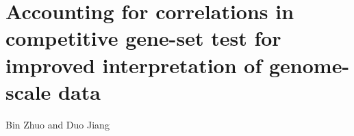 \section{Accounting for correlations in competitive gene-set
	test for improved interpretation of genome-scale data}\label{chap3}

\vspace*{5cm}
\begin{centering}
	{\normalsize Bin Zhuo and Duo Jiang}\\[.04\textheight]
\end{centering}	
\vspace*{5cm}

\newpage


	\begin{abstract}
	Competitive gene-set test is a widely used tool for interpreting high-throughput biological 
	data, such as gene expression and proteomics data. It aims at testing categories of genes for 
	enriched association signals in a list of genes inferred from genome-wide data. Most 
	conventional enrichment testing methods ignore or do not properly account for the widespread 
	correlations among genes, which, as we show, can result in inflated type I error rates and 
	power loss. We propose a new framework, \OurMethod, for gene set test based on a mixed effects 
	quasi-likelihood model, where the data are not required to be Gaussian. Our method effectively 
	adjusts for completely unknown,	unstructured correlations among the genes. It uses a score test 
	approach and allows for analytical assessment of $p$-values. Compared to existing methods such 
	as GSEA and CAMERA, our method enjoys robust and substantially improved control over type I 
	error and maintains good power in a variety of correlation structure and association settings. 
	We also present two real data analysis to illustrate our approach.
	\end{abstract}
	
	
